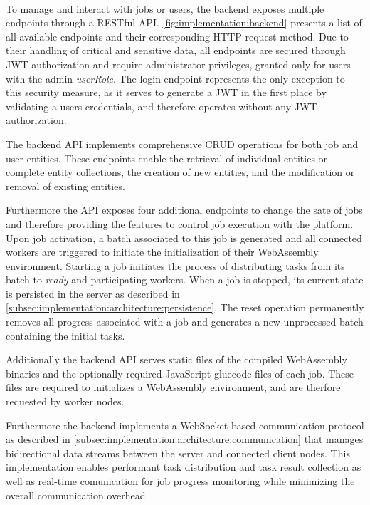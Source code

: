 ~\\
To manage and interact with jobs or users, the backend exposes multiple endpoints through a \acs{REST}ful \ac{API}. \autoref{fig:implementation:backend} presents a list of all available endpoints and their corresponding \acs{HTTP} request method. Due to their handling of critical and sensitive data, all endpoints are secured through \ac{JWT} authorization and require administrator privileges, granted only for users with the admin \emph{userRole}. The login endpoint represents the only exception to this security measure, as it serves to generate a \ac{JWT} in the first place by validating a users credentials, and therefore operates without any \ac{JWT} authorization.

The backend \ac{API} implements comprehensive \ac{CRUD} operations for both job and user entities. These endpoints enable the retrieval of individual entities or complete entity collections, the creation of new entities, and the modification or removal of existing entities.

Furthermore the \ac{API} exposes four additional endpoints to change the sate of jobs and therefore providing the features to control job execution with the platform. Upon job activation, a batch associated to this job is generated and all connected workers are triggered to initiate the initialization of their WebAssembly environment. Starting a job initiates the process of distributing tasks from its batch to \emph{ready} and participating workers. When a job is stopped, its current state is persisted in the server as described in \autoref{subsec:implementation:architecture:persistence}. The reset operation permanently removes all progress associated with a job and generates a new unprocessed batch containing the initial tasks.

Additionally the backend \ac{API} serves static files of the compiled WebAssembly binaries and the optionally required JavaScript gluecode files of each job. These files are required to initializes a WebAssembly environment, and are therfore requested by worker nodes.

Furthermore the backend implements a WebSocket-based communication protocol as described in \autoref{subsec:implementation:architecture:communication} that manages bidirectional data streams between the server and connected client nodes. This implementation enables performant task distribution and task result collection as well as real-time comunication for job progress monitoring while minimizing the overall communication overhead.

